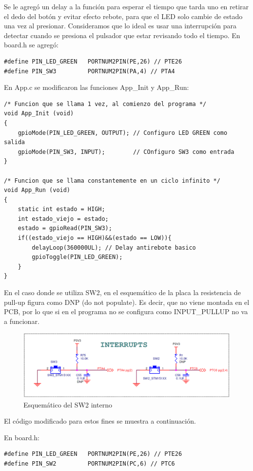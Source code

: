 \documentclass{article}
\begin{document}
Se le agregó un delay a la función para esperar el tiempo que tarda uno en retirar el dedo del botón y evitar efecto rebote, para que el LED solo cambie de estado una vez al presionar. Consideramos que lo ideal es usar una interrupción para detectar cuando se presiona el pulsador que estar revisando todo el tiempo.
En board.h se agregó:

\begin{lstlisting}
#define PIN_LED_GREEN   PORTNUM2PIN(PE,26) // PTE26
#define PIN_SW3         PORTNUM2PIN(PA,4) // PTA4
\end{lstlisting}

En App.c se modificaron las funciones App\_Init y App\_Run:

\begin{lstlisting}
/* Funcion que se llama 1 vez, al comienzo del programa */
void App_Init (void)
{
    gpioMode(PIN_LED_GREEN, OUTPUT); // Configuro LED GREEN como salida
    gpioMode(PIN_SW3, INPUT);        // COnfiguro SW3 como entrada
}

/* Funcion que se llama constantemente en un ciclo infinito */
void App_Run (void)
{
	static int estado = HIGH;
	int estado_viejo = estado;
	estado = gpioRead(PIN_SW3);
	if((estado_viejo == HIGH)&&(estado == LOW)){
		delayLoop(360000UL); // Delay antirebote basico
		gpioToggle(PIN_LED_GREEN);
	}
}
\end{lstlisting}

En el caso donde se utiliza SW2, en el esquemático de la placa la resistencia de pull-up figura como DNP (do not populate). Es decir, que no viene montada en el PCB, por lo que si en el programa no se configura como INPUT\_PULLUP no va a funcionar.

\begin{figure}[ht]
	\centering
	\includegraphics[width=0.7 \textwidth]
	{../Imagenes/SW2_DNP.png}
	\caption{Esquemático del SW2 interno}
	\label{fig:ej1}
\end{figure}

El código modificado para estos fines se muestra a continuación.

En board.h:

\begin{lstlisting}
#define PIN_LED_GREEN   PORTNUM2PIN(PE,26) // PTE26
#define PIN_SW2         PORTNUM2PIN(PC,6) // PTC6
\end{lstlisting}
\end{document}
